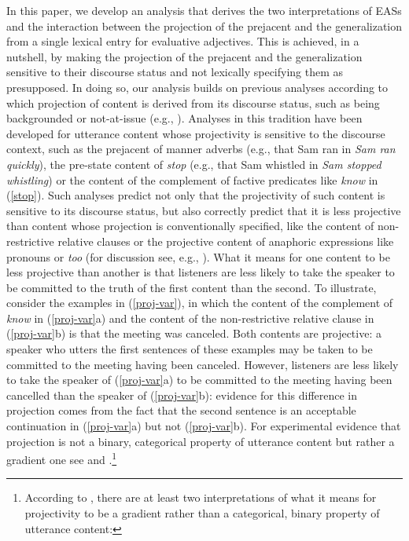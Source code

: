 \documentclass[11pt,fleqn]{article}
\newcommand{\6}{\mbox{$[\hspace*{-.6mm}[$}}
\newcommand{\9}{\mbox{$]\hspace*{-.6mm}]$}}
\begin{document}
In this paper, we develop an analysis that derives the two interpretations of EASs and the interaction between the projection of the prejacent and the generalization from a single lexical entry for evaluative adjectives. This is achieved, in a nutshell, by making the projection of the prejacent and the generalization sensitive to their discourse status and not lexically specifying them as presupposed. In doing so, our analysis builds on previous analyses according to which projection of content is derived from its discourse status, such as being backgrounded or not-at-issue (e.g., \citealt{abrusan2011,abrusan2013,abrusan2016,brst-salt10,best-question,brst-ar,tbd-variability,tonhauser-etal-sub23}). Analyses in this tradition have been developed for utterance content whose projectivity is sensitive to the discourse context, such as the prejacent of manner adverbs (e.g., that Sam ran in {\em Sam ran quickly}), the pre-state content of {\em stop} (e.g., that Sam whistled in {\em Sam stopped whistling}) or the content of the complement of factive predicates like {\em know} in (\ref{stop}). Such analyses predict not only that the projectivity of such content is sensitive to its discourse status, but also correctly predict that it is less projective than content whose projection is conventionally specified, like the content of non-restrictive relative clauses or the projective content of anaphoric expressions like pronouns or {\em too} (for discussion see, e.g., \citealt{kadmon01,potts05,abrusan2011,abrusan2016,brst-lang11,tbd-variability,tonhauser-etal-sub23}). What it means for one content to be less projective than another is that listeners are less likely to take the speaker to be committed to the truth of the first content than the second. To illustrate, consider the examples in (\ref{proj-var}), in which the content of the complement of {\em know} in (\ref{proj-var}a) and the content of the non-restrictive relative clause in (\ref{proj-var}b) is that the meeting was canceled. Both contents are projective: a speaker who utters the first sentences of these examples may be taken to be committed to the meeting having been canceled. However, listeners are less likely to take the speaker of (\ref{proj-var}a) to be committed to the meeting having been cancelled than the speaker of (\ref{proj-var}b): evidence for this difference in projection comes from the fact that the second sentence is an acceptable continuation in (\ref{proj-var}a) but not (\ref{proj-var}b). For experimental evidence that projection is not a binary, categorical property of utterance content but rather a gradient one see \citealt{smith-hall11,xue-onea11} and \citealt{tbd-variability,tonhauser-etal-sub23}.\footnote{According to \citealt[498f.]{tbd-variability}, there are at least two interpretations of what it means for projectivity to be a gradient rather than a categorical, binary property of utterance content: 

}
\end{document}
